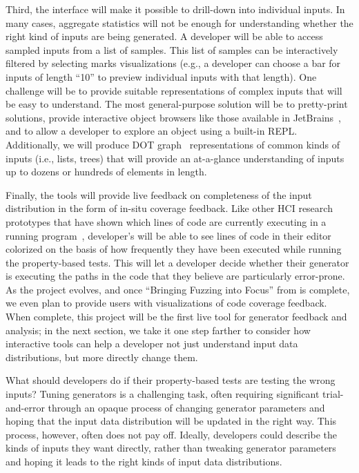 Third, the interface will make it possible to drill-down into individual inputs.
In many cases, aggregate statistics will not be enough for understanding whether
the right kind of inputs are being generated. A developer will be able to access
sampled inputs from a list of samples. This list of samples can be interactively
filtered by selecting marks visualizations (e.g., a developer can choose a bar
for inputs of length ``10'' to preview individual inputs with that length). One
challenge will be to provide suitable representations of complex inputs that
will be easy to understand. The most general-purpose solution will be to
pretty-print solutions, provide interactive object browsers like those available
in JetBrains~\cite{tool:jetbrains}, and to allow a developer to explore an
object using a built-in REPL. Additionally, we will produce DOT
graph~\cite{ellson_graphviz_2002} representations of common kinds of inputs
(i.e., lists, trees) that will provide an at-a-glance understanding of inputs up
to dozens or hundreds of elements in length.

Finally, the tools will provide live feedback on completeness of the input
distribution in the form of in-situ coverage feedback. Like other HCI research
prototypes that have shown which lines of code are currently executing in a
running
program~\cite{ref:brandt2010rehearse,ref:oney2009firecrystal,ref:burg2013record},
developer's will be able to see lines of code in their editor colorized on the
basis of how frequently they have been executed while running the property-based
tests. This will let a developer decide whether their generator is executing the
paths in the code that they believe are particularly error-prone.
\iflater
As the project evolves, and once ``Bringing Fuzzing into Focus'' from
 is complete, we even plan to provide users with
visualizations of code coverage feedback.
\fi
When complete, this project will be the first live tool for generator
feedback and analysis; in the next section, we take it one step farther to
consider how interactive tools can help a developer not just understand input
data distributions, but more directly change them.

%
What should developers do if their property-based tests are testing the wrong
inputs? Tuning generators is a challenging task,
often requiring significant trial-and-error through an opaque process of
changing generator parameters and hoping that the input data distribution will
be updated in the right way. This process, however, often does not pay off.
Ideally, developers could describe the kinds of inputs they want directly,
rather than tweaking generator parameters and hoping it leads to the right kinds
of input data distributions.

